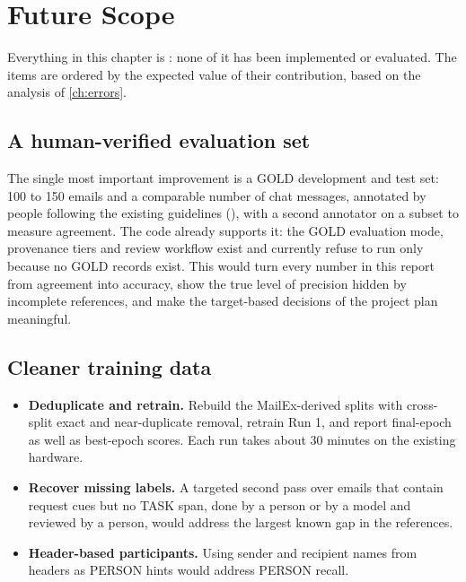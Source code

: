 \chapter{Future Scope}
\label{ch:future}

Everything in this chapter is : none of it has been implemented or evaluated. The items are ordered by the expected value of their contribution, based on the analysis of \cref{ch:errors}.

\section{A human-verified evaluation set}
The single most important improvement is a GOLD development and test set: 100 to 150 emails and a comparable number of chat messages, annotated by people following the existing guidelines (), with a second annotator on a subset to measure agreement. The code already supports it: the GOLD evaluation mode, provenance tiers and review workflow exist and currently refuse to run only because no GOLD records exist. This would turn every number in this report from agreement into accuracy, show the true level of precision hidden by incomplete references, and make the target-based decisions of the project plan meaningful.

\section{Cleaner training data}
\begin{itemize}
  \item \textbf{Deduplicate and retrain.} Rebuild the MailEx-derived splits with cross-split exact and near-duplicate removal, retrain Run 1, and report final-epoch as well as best-epoch scores. Each run takes about 30 minutes on the existing hardware.
  \item \textbf{Recover missing labels.} A targeted second pass over emails that contain request cues but no TASK span, done by a person or by a model and reviewed by a person, would address the largest known gap in the references.
  \item \textbf{Header-based participants.} Using sender and recipient names from headers as PERSON hints would address PERSON recall.
\end{itemize}


